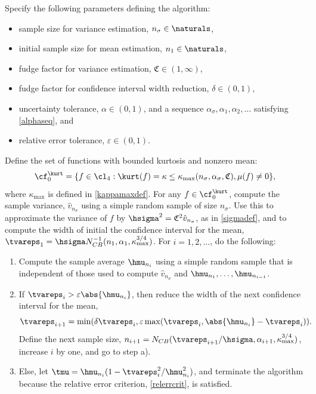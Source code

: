 \documentclass[graybox]{svmult}
\newcommand{\hv}{\hat{v}}
\newcommand{\fudge}{\mathfrak{C}}
\begin{document}
\begin{theorem} \label{relerradaptthm} Specify the following parameters defining the algorithm:
\begin{itemize}
\item sample size for variance estimation, $n_{\sigma} \in \naturals$,
\item initial sample size for mean estimation, $n_1 \in \naturals$,
\item fudge factor for variance estimation, $\fudge \in (1,\infty)$, 
\item fudge factor for confidence interval width reduction, $\delta \in (0,1)$,
\item uncertainty tolerance, $\alpha\in (0,1)$, and a sequence $\alpha_{\sigma}, \alpha_1,  \alpha_2, \ldots$ satisfying \eqref{alphaseq}, and
\item relative error tolerance, $\varepsilon \in (0,1)$. 
\end{itemize} 
Define the set of functions with bounded kurtosis and nonzero mean:
\[
\cf^{\kurt}_0= \{f \in \cl_{4} : \kurt(f)= \kappa \le \kappa_{\max}(n_{\sigma},\alpha_{\sigma},\fudge), \mu(f) \ne 0\},
\]
where $\kappa_{\max}$ is defined in \eqref{kappamaxdef}.  For any $f \in \cf^{\kurt}_0$, compute the sample variance, $\hv_{n_{\sigma}}$ using a simple random sample of size $n_{\sigma}$. Use this to approximate the variance of $f$ by $\hsigma^2 = \fudge^2 \hv_{n_{\sigma}}$, as in \eqref{sigmadef}, and to compute the width of initial the confidence interval for the mean, $\tvareps_1=\hsigma N_{CB}^{-1}(n_1,\alpha_1,\kappa_{\max}^{3/4})$.  For $i=1, 2, \ldots$, do the following:
\begin{enumerate}
\renewcommand{\labelenumi}{\alph{enumi})}
\item Compute the sample average $\hmu_{n_i}$ using a simple random sample that is independent of those used to compute $\hv_{n_{\sigma}}$ and $\hmu_{n_1}, \ldots, \hmu_{n_{i-1}}$.

\item If $\tvareps_i > \varepsilon \abs{\hmu_{n_i}}$, then reduce the width of the next confidence interval for the mean, 
\[
\tvareps_{i+1} = \min(\delta\tvareps_i, \varepsilon \max(\tvareps_i,\abs{\hmu_{n_i}}-\tvareps_i)).
\]
Define the next sample size, $n_{i+1} = N_{CB}(\tvareps_{i+1}/\hsigma,\alpha_{i+1},\kappa_{\max}^{3/4})$,
increase $i$ by one, and go to step a). 

\item Else, let $\tmu = \hmu_{n_i}(1 - \tvareps_i^2/\hmu_{n_i}^2)$, and terminate the algorithm because the relative error criterion, \eqref{relerrcrit}, is satisfied.

\end{enumerate}
\end{theorem}
\end{document}
